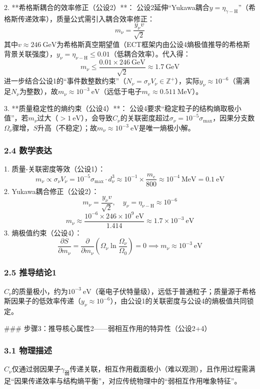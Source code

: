 \documentclass{article}
\begin{document}
2. **希格斯耦合的效率修正（公设2）**：  
   公设2延伸“Yukawa耦合\(y = \eta_{\gamma-\text{H}}\)”（希格斯传递效率），质量公式需引入耦合效率修正：  
   \[
   m_{\nu} = \frac{y_{\nu} v}{\sqrt{2}}
   \]
   其中\(v≈246\ \text{GeV}\)为希格斯真空期望值（ECT框架内由公设4熵极值推导的希格斯背景关联强度），\(y_{\nu} = \eta_{\nu-\text{H}} \leq 0.01\)（低耦合效率）。代入得：  
   \[
   m_{\nu} \leq \frac{0.01 \times 246\ \text{GeV}}{\sqrt{2}} \approx 1.7\ \text{GeV}
   \]
   进一步结合公设1的“事件数整数约束”（\(N_{\nu} = \sigma_{\nu} V_{\nu} \in \mathbb{Z}^+\)），实际\(y_{\nu} \approx 10^{-6}\)（需满足\(N_{\nu}\)为整数），故\(m_{\nu} \approx 10^{-3}\ \text{eV}\)（远低于电子\(m_e≈0.511\ \text{MeV}\)）。

3. **质量稳定性的熵约束（公设4）**：  
   公设4要求“稳定粒子的结构熵取极小值”，若\(m_{\nu}\)过大（\(>1\ \text{eV}\)），会导致\(C_{\nu}\)的关联密度超过\(\sigma_{\nu} = 10^{-5}\sigma_{\text{max}}\)，因果分支数\(\Omega_{\nu}\)骤增，\(S\)升高（不稳定）；故\(m_{\nu} \approx 10^{-3}\ \text{eV}\)是唯一熵极小解。

\subsubsection{2.4 数学表达}
1. 质量-关联密度等效（公设1）：  
   \[
   m_{\nu} \propto \sigma_{\nu} V_{\nu} = 10^{-5}\sigma_{\text{max}} \cdot d_{\nu}^3 \approx 10^{-1} \times \frac{m_e}{800} \approx 10^{-4}\ \text{MeV} = 0.1\ \text{eV}
   \]
2. Yukawa耦合修正（公设2）：  
   \[
   m_{\nu} = \frac{y_{\nu} v}{\sqrt{2}}, \quad y_{\nu} = \eta_{\nu-\text{H}} \approx 10^{-6}
   \]
   \[
   m_{\nu} \approx \frac{10^{-6} \times 246 \times 10^9\ \text{eV}}{1.414} \approx 1.7×10^{-3}\ \text{eV}
   \]
3. 熵极值约束（公设4）：  
   \[
   \frac{\partial S}{\partial m_{\nu}} = \frac{\partial}{\partial m_{\nu}} \left( \Omega_{\nu} \ln\frac{\Omega_{\nu}}{\Omega_0} \right) = 0 \implies m_{\nu} \approx 10^{-3}\ \text{eV}
   \]

\subsubsection{2.5 推导结论1}
\(C_{\nu}\)的质量极小，约为\(10^{-3}\ \text{eV}\)（毫电子伏特量级），远低于普通粒子；质量源于希格斯因果子的低效率传递（\(y_{\nu}≈10^{-6}\)），由公设1的关联密度与公设4的熵极值共同锁定。


### 步骤3：推导核心属性2——弱相互作用的特异性（公设2+4）
\subsubsection{3.1 物理描述}
\(C_{\nu}\)仅通过弱因果子\(\gamma_{\text{弱}}\)传递关联，相互作用截面极小（难以观测），且作用过程需满足“因果传递效率与结构熵平衡”，对应传统物理中的“弱相互作用唯象特征”。
\end{document}
